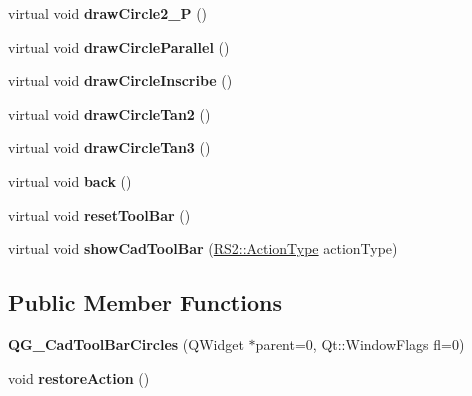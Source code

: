 \begin{DoxyCompactItemize}
\item 
\hypertarget{classQG__CadToolBarCircles_aee416a972db9a07f3c09008c054c4616}{virtual void {\bfseries draw\-Circle2\-\_\-P} ()}\label{classQG__CadToolBarCircles_aee416a972db9a07f3c09008c054c4616}

\item 
\hypertarget{classQG__CadToolBarCircles_a58cfbaad910ff56f5cd2f55143169bf4}{virtual void {\bfseries draw\-Circle\-Parallel} ()}\label{classQG__CadToolBarCircles_a58cfbaad910ff56f5cd2f55143169bf4}

\item 
\hypertarget{classQG__CadToolBarCircles_ac74901d0e78d457f21b29ce069566464}{virtual void {\bfseries draw\-Circle\-Inscribe} ()}\label{classQG__CadToolBarCircles_ac74901d0e78d457f21b29ce069566464}

\item 
\hypertarget{classQG__CadToolBarCircles_ac2463718dbf9121346cebdfe538a5425}{virtual void {\bfseries draw\-Circle\-Tan2} ()}\label{classQG__CadToolBarCircles_ac2463718dbf9121346cebdfe538a5425}

\item 
\hypertarget{classQG__CadToolBarCircles_ac20dbdbeab30cb6b2db803881ef671fd}{virtual void {\bfseries draw\-Circle\-Tan3} ()}\label{classQG__CadToolBarCircles_ac20dbdbeab30cb6b2db803881ef671fd}

\item 
\hypertarget{classQG__CadToolBarCircles_a72391c3a4b072b3f28b72e2c5d8e932d}{virtual void {\bfseries back} ()}\label{classQG__CadToolBarCircles_a72391c3a4b072b3f28b72e2c5d8e932d}

\item 
\hypertarget{classQG__CadToolBarCircles_a0216e1b73698c23b4a4945fe4b93813f}{virtual void {\bfseries reset\-Tool\-Bar} ()}\label{classQG__CadToolBarCircles_a0216e1b73698c23b4a4945fe4b93813f}

\item 
\hypertarget{classQG__CadToolBarCircles_a7d08e5b65ec296bd618f08d9a1b0c366}{virtual void {\bfseries show\-Cad\-Tool\-Bar} (\hyperlink{classRS2_afe3523e0bc41fd637b892321cfc4b9d7}{R\-S2\-::\-Action\-Type} action\-Type)}\label{classQG__CadToolBarCircles_a7d08e5b65ec296bd618f08d9a1b0c366}

\end{DoxyCompactItemize}
\subsection*{Public Member Functions}
\begin{DoxyCompactItemize}
\item 
\hypertarget{classQG__CadToolBarCircles_a737f52b9209df3c6ea3622526e6d04ec}{{\bfseries Q\-G\-\_\-\-Cad\-Tool\-Bar\-Circles} (Q\-Widget $\ast$parent=0, Qt\-::\-Window\-Flags fl=0)}\label{classQG__CadToolBarCircles_a737f52b9209df3c6ea3622526e6d04ec}

\item 
\hypertarget{classQG__CadToolBarCircles_ad2c437c720c4ddfec5ac503677102ccd}{void {\bfseries restore\-Action} ()}\label{classQG__CadToolBarCircles_ad2c437c720c4ddfec5ac503677102ccd}

\end{DoxyCompactItemize}
